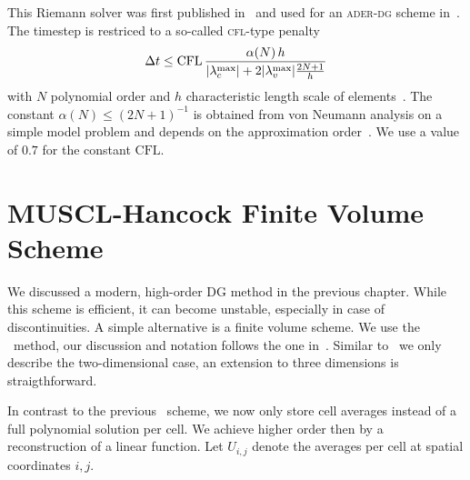 This Riemann solver was first published in~\cite{gassner2008discontinuous} and used for an \textsc{ader-dg} scheme in~\cite{dumbser2010arbitrary}.
The timestep is restriced to a so-called \textsc{cfl}-type penalty
\begin{equation}\label{eq:cfl-aderdg}
 \Delta t \leq  \text{CFL} \, \frac{\alpha(N) \, h}{\maxConvEigen + 2 \maxViscEigen \frac{2N+1}{h}}
\end{equation}
with $N$ polynomial order and $h$ characteristic length scale of elements~\cite{dumbser2010arbitrary,gassner2008discontinuous}.
The constant $\alpha(N) \leq {\left( 2N+1  \right)}^{-1}$ is obtained from von Neumann analysis on a simple model problem and depends on the approximation order~\cite{dumbser2008unified}.
We use a value of $0.7$ for the constant $\text{CFL}$.

\section{MUSCL-Hancock Finite Volume Scheme}\label{sec:muscl}
\newcommand{\cellAvg}[1][i,j]{U_{#1}}
\newcommand{\sign}{\operatorname{sign}}
\newcommand{\minmod}{\operatorname{minmod}}
\newcommand{\slope}[2][i,j]{s^{#2}_{#1}}
\newcommand{\gradCellAvg}[1][i,j]{\gradient{\cellAvg[#1]}}
\newcommand{\fluxX}{\flux_x}
\newcommand{\fluxY}{\flux_y}
We discussed a modern, high-order \textsc{DG} method in the previous chapter.
While this scheme is efficient, it can become unstable, especially in case of discontinuities.
A simple alternative is a finite volume scheme.
We use the \muscl\ method, our discussion and notation follows the one in~\cite{toro2013riemann}.
Similar to~\cite{toro2013riemann} we only describe the two-dimensional case, an extension to three dimensions is straigthforward.

In contrast to the previous \dg\ scheme, we now only store cell averages instead of a full polynomial solution per cell.
We achieve higher order then by a reconstruction of a linear function.
Let $\cellAvg$ denote the averages per cell at spatial coordinates $i,j$.

